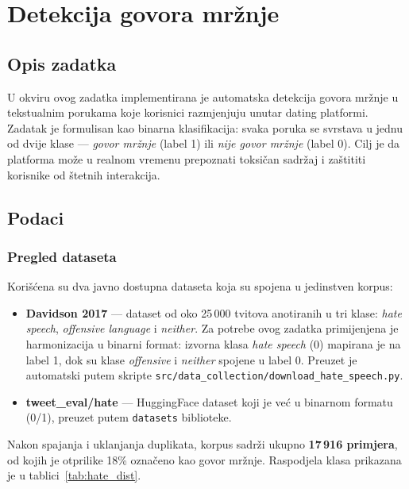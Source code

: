 \chapter{Detekcija govora mržnje}

\section{Opis zadatka}

U okviru ovog zadatka implementirana je automatska detekcija govora mržnje u tekstualnim porukama koje korisnici razmjenjuju unutar dating platformi. Zadatak je formulisan kao binarna klasifikacija: svaka poruka se svrstava u jednu od dvije klase --- \textit{govor mržnje} (label 1) ili \textit{nije govor mržnje} (label 0). Cilj je da platforma može u realnom vremenu prepoznati toksičan sadržaj i zaštititi korisnike od štetnih interakcija.

\section{Podaci}

\subsection{Pregled dataseta}

Korišćena su dva javno dostupna dataseta koja su spojena u jedinstven korpus:

\begin{itemize}
    \item \textbf{Davidson 2017} \cite{davidson2017} --- dataset od oko 25\,000 tvitova anotiranih u tri klase: \textit{hate speech}, \textit{offensive language} i \textit{neither}. Za potrebe ovog zadatka primijenjena je harmonizacija u binarni format: izvorna klasa \textit{hate speech} (0) mapirana je na label 1, dok su klase \textit{offensive} i \textit{neither} spojene u label 0. Preuzet je automatski putem skripte \texttt{src/data\_collection/download\_hate\_speech.py}.
    \item \textbf{tweet\_eval/hate} \cite{barbieri2020tweeteval} --- HuggingFace dataset koji je već u binarnom formatu (0/1), preuzet putem \texttt{datasets} biblioteke.
\end{itemize}

Nakon spajanja i uklanjanja duplikata, korpus sadrži ukupno \textbf{17\,916 primjera}, od kojih je otprilike 18\% označeno kao govor mržnje. Raspodjela klasa prikazana je u tablici~\ref{tab:hate_dist}.


